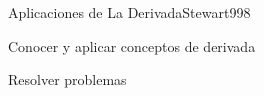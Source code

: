 \begin{syllabus}
\begin{unit}{Aplicaciones de La Derivada}{Stewart99}{8}
\begin{learningoutcomes}
	\item Conocer y aplicar conceptos de derivada
	\item Resolver problemas
\end{learningoutcomes}
\end{unit}

\begin{coursebibliography}
\end{coursebibliography}
\end{syllabus}



